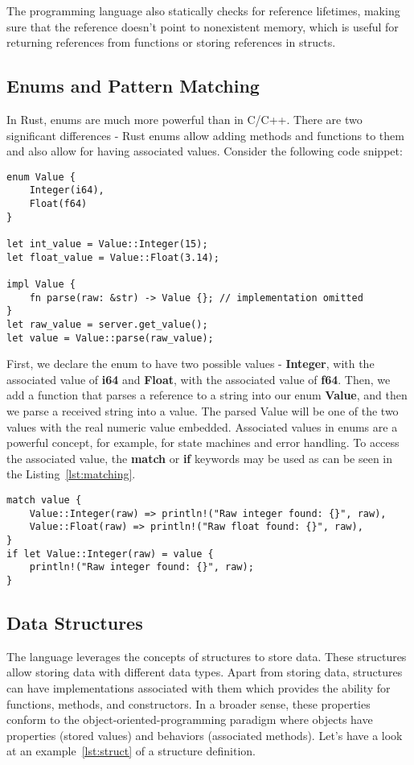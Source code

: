 The programming language also statically checks for reference lifetimes, making sure that the reference doesn't point to nonexistent memory, which is useful for returning references from functions or storing references in structs.

\subsection{Enums and Pattern Matching}
\label{subsec:enum}
In Rust, enums are much more powerful than in C/C++.
There are two significant differences - Rust enums allow adding methods and functions to them and also allow for having associated values.
Consider the following code snippet:

\begin{lstlisting}[caption={Definining an enum with associated values in Rust.},label=lst:enum]
enum Value {
    Integer(i64),
    Float(f64)
}

let int_value = Value::Integer(15);
let float_value = Value::Float(3.14);

impl Value {
    fn parse(raw: &str) -> Value {}; // implementation omitted
}
let raw_value = server.get_value();
let value = Value::parse(raw_value);
\end{lstlisting}

First, we declare the enum to have two possible values - \textbf{Integer}, with the associated value of \textbf{i64} and \textbf{Float}, with the associated value of \textbf{f64}.
Then, we add a function that parses a reference to a string into our enum \textbf{Value}, and then we parse a received string into a value.
The parsed Value will be one of the two values with the real numeric value embedded.
Associated values in enums are a powerful concept, for example, for state machines and error handling.
To access the associated value, the \textbf{match} or \textbf{if} keywords may be used as can be seen in the Listing~\ref{lst:matching}.

\begin{lstlisting}[caption={Matching an enum variants.},label=lst:matching]
match value {
    Value::Integer(raw) => println!("Raw integer found: {}", raw),
    Value::Float(raw) => println!("Raw float found: {}", raw),
}
if let Value::Integer(raw) = value {
    println!("Raw integer found: {}", raw);
}
\end{lstlisting}

\newpage
\subsection{Data Structures}
\label{subsec:struct}
The language leverages the concepts of structures to store data.
These structures allow storing data with different data types.
Apart from storing data, structures can have implementations associated with them which provides the ability for functions, methods, and constructors.
In a broader sense, these properties conform to the object-oriented-programming paradigm where objects have properties (stored values) and behaviors (associated methods).
Let's have a look at an example~\ref{lst:struct} of a structure definition.

